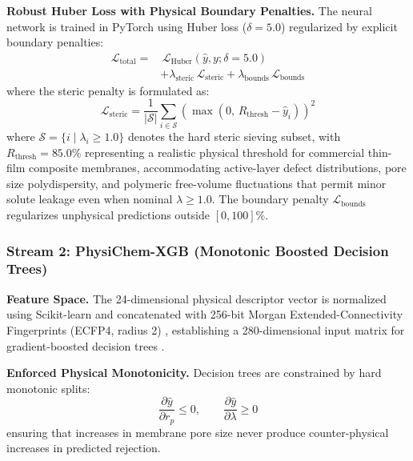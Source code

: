 \documentclass[10pt,twocolumn]{article}
\begin{document}
\textbf{Robust Huber Loss with Physical Boundary Penalties.} The neural network is trained in PyTorch \cite{paszke2019} using Huber loss ($\delta = 5.0$) regularized by explicit boundary penalties:
\begin{equation}
\begin{split}
\mathcal{L}_{\mathrm{total}} = &\,\mathcal{L}_{\mathrm{Huber}}(\hat{y}, y; \delta = 5.0) \\
&+ \lambda_{\mathrm{steric}}\,\mathcal{L}_{\mathrm{steric}} + \lambda_{\mathrm{bounds}}\,\mathcal{L}_{\mathrm{bounds}}
\end{split}
\label{eq:loss}
\end{equation}
where the steric penalty is formulated as:
\begin{equation}
\mathcal{L}_{\mathrm{steric}} = \frac{1}{|\mathcal{S}|} \sum_{i \in \mathcal{S}} \left( \max\left(0,\, R_{\mathrm{thresh}} - \hat{y}_i\right) \right)^2
\label{eq:steric_loss}
\end{equation}
where $\mathcal{S} = \{i \mid \lambda_i \ge 1.0\}$ denotes the hard steric sieving subset, with $R_{\mathrm{thresh}} = 85.0\%$ representing a realistic physical threshold for commercial thin-film composite membranes, accommodating active-layer defect distributions, pore size polydispersity, and polymeric free-volume fluctuations that permit minor solute leakage even when nominal $\lambda \ge 1.0$. The boundary penalty $\mathcal{L}_{\mathrm{bounds}}$ regularizes unphysical predictions outside $[0, 100]\%$.

\subsubsection{Stream 2: PhysiChem-XGB (Monotonic Boosted Decision Trees)}

\textbf{Feature Space.} The 24-dimensional physical descriptor vector is normalized using Scikit-learn \cite{pedregosa2011} and concatenated with 256-bit Morgan Extended-Connectivity Fingerprints (ECFP4, radius 2) \cite{rogers2010}, establishing a 280-dimensional input matrix for gradient-boosted decision trees \cite{chen2016,ke2017}.

\textbf{Enforced Physical Monotonicity.} Decision trees are constrained by hard monotonic splits:
\begin{equation}
\frac{\partial \hat{y}}{\partial r_p} \leq 0, \qquad \frac{\partial \hat{y}}{\partial \lambda} \geq 0
\label{eq:monotonic}
\end{equation}
ensuring that increases in membrane pore size never produce counter-physical increases in predicted rejection.
\end{document}
